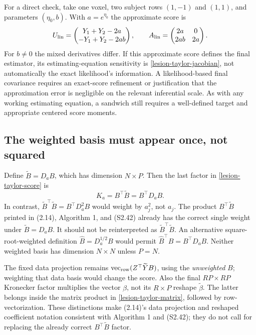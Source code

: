 \documentclass[11pt,a4paper]{article}
\newcommand{\vr}{\operatorname{vec}_{\rm row}}
\numberwithin{equation}{section}
\begin{document}
For a direct check, take one voxel, two subject rows $(1,-1)$
and $(1,1)$, and parameters $(\eta_0,b)$.
With $a=e^{\eta_0}$ the approximate score is
\[
 U_{\rm lin}=
 \begin{pmatrix}Y_1+Y_2-2a\\-Y_1+Y_2-2ab\end{pmatrix},
 \qquad
 A_{\rm lin}=\begin{pmatrix}2a&0\\2ab&2a\end{pmatrix}.
\]
For $b\ne0$ the mixed derivatives differ.
If this approximate score defines the final estimator, its
estimating-equation sensitivity is \eqref{lesion-taylor-jacobian},
not automatically the exact likelihood's information.
A likelihood-based final covariance requires an exact-score
refinement or justification that the approximation error is
negligible on the relevant inferential scale.
As with any working estimating equation, a sandwich still requires
a well-defined target and appropriate centered score moments.

\subsection{The weighted basis must appear once, not squared}
Define $\widetilde B=D_aB$, which has dimension $N\times P$.
Then the last factor in \eqref{lesion-taylor-score} is
\[
 K_a=B^\top\widetilde B=B^\top D_aB.
\]
In contrast,
$\widetilde B^\top\widetilde B=B^\top D_a^2B$
would weight by $a_j^2$, not $a_j$.
The product $B^\top\widetilde B$ printed in (2.14), Algorithm 1,
and (S2.42) already has the correct single weight under
$\widetilde B=D_aB$. It should not be reinterpreted as
$\widetilde B^\top\widetilde B$.
An alternative square-root-weighted definition
$\widehat B=D_a^{1/2}B$ would permit
$\widehat B^\top\widehat B=B^\top D_aB$.
Neither weighted basis has dimension $N\times N$ unless $P=N$.

The fixed data projection remains $\vr(Z^\top\widetilde YB)$,
using the \emph{unweighted} $B$; weighting that data basis would
change the score. Also the final $RP\times RP$ Kronecker factor
multiplies the vector $\beta$, not its $R\times P$ reshape
$\widetilde\beta$. The latter belongs inside the matrix product
in \eqref{lesion-taylor-matrix}, followed by row-vectorization.
These distinctions make (2.14)'s data projection and reshaped
coefficient notation consistent with Algorithm 1 and (S2.42);
they do not call for replacing the already correct
$B^\top\widetilde B$ factor.
\end{document}
